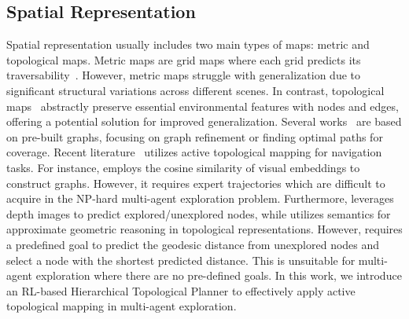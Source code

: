 \subsection{Spatial Representation}
Spatial representation usually includes two main types of maps: metric and topological maps. Metric maps are grid maps where each grid predicts its traversability~\cite{ans,save}. However, metric maps struggle with generalization due to significant structural variations across different scenes.
In contrast, topological maps~\cite{graph_generalization} abstractly preserve essential environmental features with nodes and edges, offering a potential solution for improved generalization.
Several works~\cite{topo_exploration,topo-map4} are based on pre-built graphs, focusing on graph refinement or finding optimal paths for coverage.
Recent literature~\cite{vgm,topo-map2,norl} utilizes active topological mapping for navigation tasks. For instance, \cite{vgm} employs the cosine similarity of visual embeddings to construct graphs. However, it requires expert trajectories which are difficult to acquire in the NP-hard multi-agent exploration problem.
Furthermore, \cite{norl} leverages depth images to predict explored/unexplored nodes, while \cite{topo-map2} utilizes semantics for approximate geometric reasoning in topological representations.
However, \cite{norl,topo-map2} requires a predefined goal to predict the geodesic distance from unexplored nodes and select a node with the shortest predicted distance. This is unsuitable for multi-agent exploration where there are no pre-defined goals. 
In this work, we introduce an RL-based Hierarchical Topological Planner to effectively apply active topological mapping in multi-agent exploration. 





